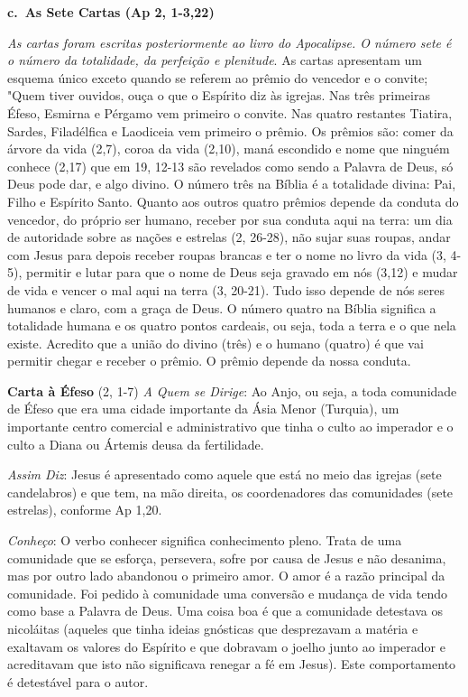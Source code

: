 \documentclass[
]{book}
\begin{document}
\textbf{c.~As Sete Cartas (Ap 2, 1-3,22)}

\emph{As cartas foram escritas posteriormente ao livro do Apocalipse. O número sete é o número da totalidade, da perfeição e plenitude}. As cartas apresentam um esquema único exceto quando se referem ao prêmio do vencedor e o convite; "Quem tiver ouvidos, ouça o que o Espírito diz às igrejas. Nas três primeiras Éfeso, Esmirna e Pérgamo vem primeiro o convite. Nas quatro restantes Tiatira, Sardes, Filadélfica e Laodiceia vem primeiro o prêmio. Os prêmios são: comer da árvore da vida (2,7), coroa da vida (2,10), maná escondido e nome que ninguém conhece (2,17) que em 19, 12-13 são revelados como sendo a Palavra de Deus, só Deus pode dar, e algo divino. O número três na Bíblia é a totalidade divina: Pai, Filho e Espírito Santo. Quanto aos outros quatro prêmios depende da conduta do vencedor, do próprio ser humano, receber por sua conduta aqui na terra: um dia de autoridade sobre as nações e estrelas (2, 26-28), não sujar suas roupas, andar com Jesus para depois receber roupas brancas e ter o nome no livro da vida (3, 4-5), permitir e lutar para que o nome de Deus seja gravado em nós (3,12) e mudar de vida e vencer o mal aqui na terra (3, 20-21). Tudo isso depende de nós seres humanos e claro, com a graça de Deus. O número quatro na Bíblia significa a totalidade humana e os quatro pontos cardeais, ou seja, toda a terra e o que nela existe. Acredito que a união do divino (três) e o humano (quatro) é que vai permitir chegar e receber o prêmio. O prêmio depende da nossa conduta.

\textbf{Carta à Éfeso} (2, 1-7)
\emph{A Quem se Dirige}: Ao Anjo, ou seja, a toda comunidade de Éfeso que era uma cidade importante da Ásia Menor (Turquia), um importante centro comercial e administrativo que tinha o culto ao imperador e o culto a Diana ou Ártemis deusa da fertilidade.

\emph{Assim Diz}: Jesus é apresentado como aquele que está no meio das igrejas (sete candelabros) e que tem, na mão direita, os coordenadores das comunidades (sete estrelas), conforme Ap 1,20.

\emph{Conheço}: O verbo conhecer significa conhecimento pleno. Trata de uma comunidade que se esforça, persevera, sofre por causa de Jesus e não desanima, mas por outro lado abandonou o primeiro amor. O amor é a razão principal da comunidade. Foi pedido à comunidade uma conversão e mudança de vida tendo como base a Palavra de Deus. Uma coisa boa é que a comunidade detestava os nicoláitas (aqueles que tinha ideias gnósticas que desprezavam a matéria e exaltavam os valores do Espírito e que dobravam o joelho junto ao imperador e acreditavam que isto não significava renegar a fé em Jesus). Este comportamento é detestável para o autor.
\end{document}
